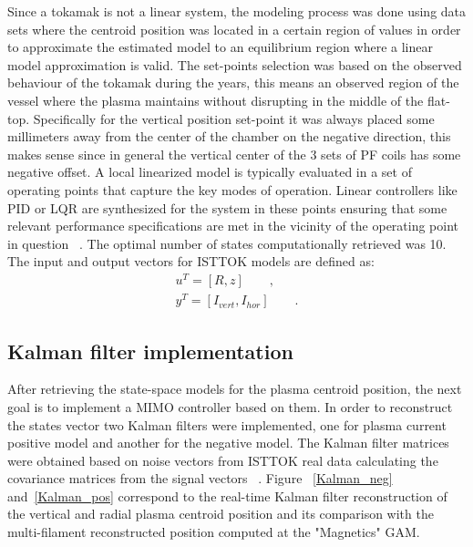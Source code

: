 Since a tokamak is not a linear system, the modeling process was done using data sets where the centroid position  was located in a certain region of values in order to approximate the estimated  model to an equilibrium region where a linear model approximation is valid. The set-points selection was based on the observed behaviour of the tokamak during the years, this means an observed region of the vessel where the plasma maintains without disrupting in the middle of the flat-top. Specifically for the  vertical position set-point it was always placed some millimeters away from the center of the chamber on the negative direction, this makes sense since  in general the vertical center of the 3 sets of PF coils has some negative offset. A local linearized model is typically evaluated in a  set of operating points that capture the key modes of operation. Linear controllers like PID  or LQR  are synthesized for the system in these points ensuring that some relevant performance specifications are met in the vicinity of the operating point in question ~\cite{Bendtsen2005}. The optimal number of states computationally retrieved was  10. The input and output vectors for ISTTOK models are defined as:
\begin{equation}
\begin{aligned}
u^T=[R, z]\qquad, \\
y^T=[I_{vert},I_{hor}]\qquad .
\end{aligned} 
\end{equation}



\subsection{Kalman filter implementation}

After retrieving the state-space models for the plasma centroid position, the next goal is to implement a MIMO controller based on them. In order to reconstruct the states vector  two Kalman filters were implemented, one for plasma current positive model and another for the negative model. The Kalman filter matrices were obtained  based on noise vectors from ISTTOK real data calculating  the covariance matrices from the signal vectors ~\cite{Mele2018}.  Figure ~\ref{Kalman_neg} and~\ref{Kalman_pos} correspond to the real-time Kalman filter reconstruction of the vertical and radial plasma centroid position and its comparison with the multi-filament reconstructed  position computed at the "Magnetics" GAM.\smallskip

